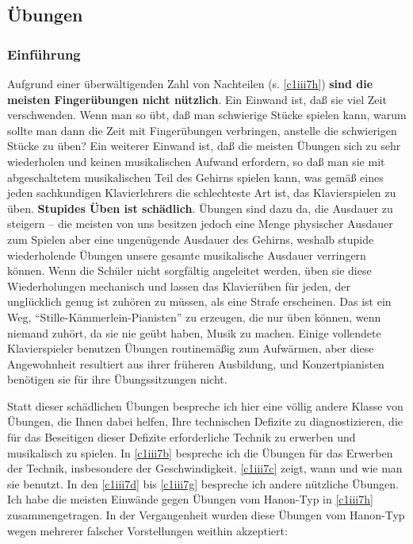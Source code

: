
\subsection{Übungen}
\label{c1iii7}

\subsubsection{Einführung}
\label{c1iii7a}

Aufgrund einer überwältigenden Zahl von Nachteilen (s. \hyperref[c1iii7h]{\autoref{c1iii7h}}) \textbf{sind die meisten Fingerübungen nicht nützlich}.
Ein Einwand ist, daß sie viel Zeit verschwenden.
Wenn man so übt, daß man schwierige Stücke spielen kann, warum sollte man dann die Zeit mit Fingerübungen verbringen, anstelle die schwierigen Stücke zu üben?
Ein weiterer Einwand ist, daß die meisten Übungen sich zu sehr wiederholen und keinen musikalischen Aufwand erfordern, so daß man sie mit abgeschaltetem musikalischen Teil des Gehirns spielen kann, was gemäß eines jeden sachkundigen Klavierlehrers die schlechteste Art ist, das Klavierspielen zu üben.
\textbf{Stupides Üben ist schädlich}.
Übungen sind dazu da, die Ausdauer zu steigern -- die meisten von uns besitzen jedoch eine Menge physischer Ausdauer zum Spielen aber eine ungenügende Ausdauer des Gehirns, weshalb stupide wiederholende Übungen unsere gesamte musikalische Ausdauer verringern können.
Wenn die Schüler nicht sorgfältig angeleitet werden, üben sie diese Wiederholungen mechanisch und lassen das Klavierüben für jeden, der unglücklich genug ist zuhören zu müssen, als eine Strafe erscheinen.
Das ist ein Weg, \enquote{Stille-Kämmerlein-Pianisten} zu erzeugen, die nur üben können, wenn niemand zuhört, da sie nie geübt haben, Musik zu machen.
Einige vollendete Klavierspieler benutzen Übungen routinemäßig zum Aufwärmen, aber diese Angewohnheit resultiert aus ihrer früheren Ausbildung, und Konzertpianisten benötigen sie für ihre Übungssitzungen nicht.

Statt dieser schädlichen Übungen bespreche ich hier eine völlig andere Klasse von Übungen, die Ihnen dabei helfen, Ihre technischen Defizite zu diagnostizieren, die für das Beseitigen dieser Defizite erforderliche Technik zu erwerben und musikalisch zu spielen.
In \hyperref[c1iii7b]{\autoref{c1iii7b}} bespreche ich die Übungen für das Erwerben der Technik, insbesondere der Geschwindigkeit.
\hyperref[c1iii7c]{\autoref{c1iii7c}} zeigt, wann und wie man sie benutzt.
In den \hyperref[c1iii7d]{\autoref{c1iii7d}} bis \hyperref[c1iii7g]{\autoref{c1iii7g}} bespreche ich andere nützliche Übungen.
Ich habe die meisten Einwände gegen Übungen vom Hanon-Typ in \hyperref[c1iii7h]{\autoref{c1iii7h}} zusammengetragen.
In der Vergangenheit wurden diese Übungen vom Hanon-Typ wegen mehrerer falscher Vorstellungen weithin akzeptiert:

